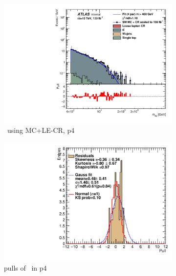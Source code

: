 \newpage

\begin{figure}[ht]
    \centering
    \begin{subfigure}[h]{0.38\linewidth}
    \includegraphics[scale=0.3]{figs/ch6/fit/variable_nosmooth/p4/01PB/output_SMMCplusCR_Mbb_p4.pdf}%
    \caption{\mbb \ using MC+LE-CR, p4}
    \end{subfigure}
    \hfill
    \begin{subfigure}[h]{0.4\linewidth}
    \includegraphics[scale=0.32]{figs/ch6/fit/variable_nosmooth/p4/01PB/pull_SMMCplusCR_Mbb_p4.pdf}%
    \caption{pulls of \mbb \ in p4}
    \end{subfigure}
    \hfill
    \begin{subfigure}[h]{0.38\linewidth}

\end{subfigure}
\end{figure}
